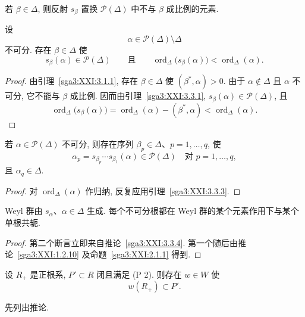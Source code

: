 \begin{corollary}\label{sga3:XXI:3.3.2}
若 \(\beta\in\Delta\), 则反射 \(s_\beta\) 置换 \(\mathscr{P}(\Delta)\) 中不与 \(\beta\) 成比例的元素.
\end{corollary}

\begin{lemma}\label{sga3:XXI:3.3.3}
设
\[
 \alpha\in\mathscr{P}(\Delta)\setminus\Delta
\]
不可分. 存在 \(\beta\in\Delta\) 使
\[
 s_\beta(\alpha)\in\mathscr{P}(\Delta)
 \qquad\text{且}\qquad
 \operatorname{ord}_\Delta\bigl(s_\beta(\alpha)\bigr)
   <\operatorname{ord}_\Delta(\alpha).
\]
\end{lemma}
\begin{proof}
由引理~\ref{sga3:XXI:3.1.1}, 存在 \(\beta\in\Delta\) 使 \((\beta^\ast,\alpha)>0\). 由于 \(\alpha\notin\Delta\) 且 \(\alpha\) 不可分, 它不能与 \(\beta\) 成比例. 因而由引理~\ref{sga3:XXI:3.3.1}, \(s_\beta(\alpha)\in\mathscr{P}(\Delta)\), 且
\[
 \operatorname{ord}_\Delta\bigl(s_\beta(\alpha)\bigr)
 =\operatorname{ord}_\Delta(\alpha)-(\beta^\ast,\alpha)
 <\operatorname{ord}_\Delta(\alpha).
\]
\end{proof}

\begin{corollary}\label{sga3:XXI:3.3.4}
若 \(\alpha\in\mathscr{P}(\Delta)\) 不可分, 则存在序列 \(\beta_p\in\Delta\)、\(p=1,\ldots,q\), 使
\[
 \alpha_p
 =s_{\beta_p}\cdots s_{\beta_1}(\alpha)
 \in\mathscr{P}(\Delta)
 \quad\text{对 }p=1,\ldots,q,
\]
且 \(\alpha_q\in\Delta\).
\end{corollary}
\begin{proof}
对 \(\operatorname{ord}_\Delta(\alpha)\) 作归纳, 反复应用引理~\ref{sga3:XXI:3.3.3}.
\end{proof}

\begin{proposition}\label{sga3:XXI:3.3.5}
Weyl 群由 \(s_\alpha\)、\(\alpha\in\Delta\) 生成. 每个不可分根都在 Weyl 群的某个元素作用下与某个单根共轭.
\end{proposition}
\begin{proof}
第二个断言立即来自推论~\ref{sga3:XXI:3.3.4}. 第一个随后由推论~\ref{sga3:XXI:1.2.10} 及命题~\ref{sga3:XXI:2.1.1} 得到.
\end{proof}

\begin{proposition}\label{sga3:XXI:3.3.6}
设 \(R_+\) 是正根系, \(P'\subset R\) 闭且满足 (P 2). 则存在 \(w\in W\) 使
\[
 w(R_+)\subset P'.
\]
\end{proposition}
先列出推论.

